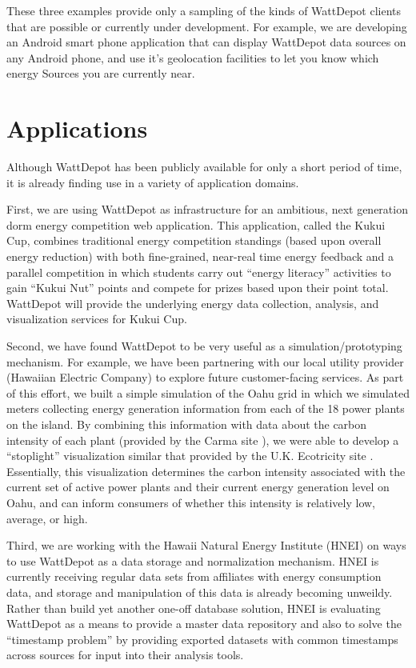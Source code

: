 \documentclass[conference,compsoc]{IEEEtran}
\begin{document}
These three examples provide only a sampling of the kinds of WattDepot
clients that are possible or currently under development. For example, we
are developing an Android smart phone application that can display
WattDepot data sources on any Android phone, and use it's geolocation
facilities to let you know which energy Sources you are currently near.

\section{Applications}

Although WattDepot has been publicly available for only a short period of
time, it is already finding use in a variety of application domains. 

First, we are using WattDepot as infrastructure for an ambitious, next
generation dorm energy competition web application.  This application,
called the Kukui Cup, combines traditional energy competition standings
(based upon overall energy reduction) with both fine-grained, near-real
time energy feedback and a parallel competition in which students carry out
``energy literacy'' activities to gain ``Kukui Nut'' points and compete for
prizes based upon their point total.  WattDepot will provide the underlying
energy data collection, analysis, and visualization services for Kukui Cup.

Second, we have found WattDepot to be very useful as a
simulation/prototyping mechanism.  For example, we have been partnering
with our local utility provider (Hawaiian Electric Company) to explore
future customer-facing services.  As part of this effort, we built a simple
simulation of the Oahu grid in which we simulated meters collecting energy
generation information from each of the 18 power plants on the island.  By
combining this information with data about the carbon intensity of each
plant (provided by the Carma site \cite{Carma}), we were able to develop a
``stoplight'' visualization similar that provided by the U.K. Ecotricity
site \cite{Ecotricity}.  Essentially, this visualization determines the
carbon intensity associated with the current set of active power plants and
their current energy generation level on Oahu, and can inform consumers of
whether this intensity is relatively low, average, or high.

Third, we are working with the Hawaii Natural Energy Institute (HNEI) on
ways to use WattDepot as a data storage and normalization mechanism.  HNEI
is currently receiving regular data sets from affiliates with energy
consumption data, and storage and manipulation of this data is already
becoming unweildy. Rather than build yet another one-off database solution,
HNEI is evaluating WattDepot as a means to provide a master data repository
and also to solve the ``timestamp problem'' by providing exported datasets
with common timestamps across sources for input into their analysis tools.
\end{document}
